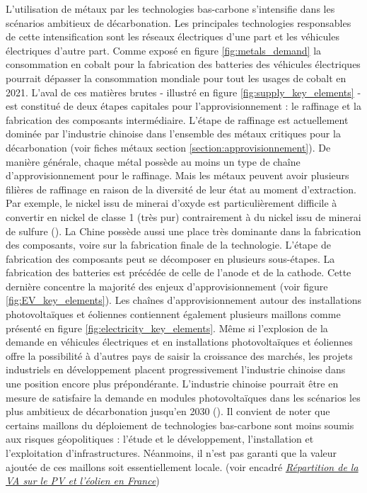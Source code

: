 L'utilisation de métaux par les technologies bas-carbone s'intensifie dans les scénarios ambitieux de décarbonation. Les principales technologies responsables de cette intensification sont les réseaux électriques d'une part et les véhicules électriques d'autre part. Comme exposé en figure \ref{fig:metals_demand} la consommation en cobalt pour la fabrication des batteries des véhicules électriques pourrait dépasser la consommation mondiale pour tout les usages de cobalt en 2021.\smallbreak
L'aval de ces matières brutes - illustré en figure \ref{fig:supply_key_elements} - est constitué de deux étapes capitales pour l'approvisionnement : le raffinage et la fabrication des composants intermédiaire.\smallbreak
L'étape de raffinage est actuellement dominée par l'industrie chinoise dans l'ensemble des métaux critiques pour la décarbonation (voir fiches métaux section \ref{section:approvisionnement}). De manière générale, chaque métal possède au moins un type de chaîne d'approvisionnement pour le raffinage. Mais les métaux peuvent avoir plusieurs filières de raffinage en raison de la diversité de leur état au moment d'extraction. Par exemple, le nickel issu de minerai d'oxyde est particulièrement difficile à convertir en nickel de classe 1 (très pur) contrairement à du nickel issu de minerai de sulfure (\cite{iea_role_2021}).\smallbreak
La Chine possède aussi une place très dominante dans la fabrication des composants, voire sur la fabrication finale de la technologie. L'étape de fabrication des composants peut se décomposer en plusieurs sous-étapes. La fabrication des batteries est précédée de celle de l'anode et de la cathode. Cette dernière concentre la majorité des enjeux d'approvisionnement (voir figure \ref{fig:EV_key_elements}). Les chaînes d'approvisionnement autour des installations photovoltaïques et éoliennes contiennent également plusieurs maillons comme présenté en figure \ref{fig:electricity_key_elements}.\smallbreak
Même si l'explosion de la demande en véhicules électriques et en installations photovoltaïques et éoliennes offre la possibilité à d'autres pays de saisir la croissance des marchés, les projets industriels en développement placent progressivement l'industrie chinoise dans une position encore plus prépondérante. L'industrie chinoise pourrait être en mesure de satisfaire la demande en modules photovoltaïques dans les scénarios les plus ambitieux de décarbonation jusqu'en 2030 (\cite{iea_energy_2023}).\smallbreak
Il convient de noter que certains maillons du déploiement de technologies bas-carbone sont moins soumis aux risques géopolitiques : l'étude et le développement, l'installation et l'exploitation d'infrastructures. Néanmoins, il n'est pas garanti que la valeur ajoutée de ces maillons soit essentiellement locale. (voir encadré \hyperref[VAENR]{\textit{Répartition de la VA sur le PV et l'éolien en France}})
